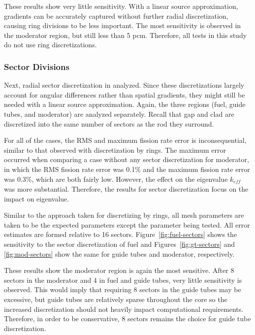 These results show very little sensitivity. With a linear source approximation, gradients can be accurately captured without further radial discretization, causing ring divisions to be less important. The most sensitivity is observed in the moderator region, but still less than 5 pcm. Therefore, all tests in this study do not use ring discretizations. 

\subsubsection{Sector Divisions}

Next, radial sector discretization in analyzed. Since these  discretizations largely account for angular differences rather than spatial gradients, they might still be needed with a linear source approximation. Again, the three regions (fuel, guide tubes, and moderator) are analyzed separately. Recall that gap and clad are discretized into the same number of sectors as the rod they surround.

For all of the cases, the \ac{RMS} and maximum fission rate error is inconsequential, similar to that observed with discretization by rings.  The maximum error occurred when comparing a case without any sector discretization for moderator, in which the \ac{RMS} fission rate error was 0.1\% and the maximum fission rate error was 0.3\%, which are both fairly low. However, the effect on the eigenvalue $k_{\textit{eff}}$ was more substantial. Therefore, the results for sector discretization focus on the impact on eigenvalue.

Similar to the approach taken for discretizing by rings, all mesh parameters are taken to be the expected parameters except the parameter being tested. All error estimates are formed relative to 16 sectors. Figure~\ref{fig:fuel-sectors} shows the sensitivity to the sector discretization of fuel and Figures~\ref{fig:gt-sectors} and \ref{fig:mod-sectors} show the same for guide tubes and moderator, respectively.

These results show the moderator region is again the most sensitive. After 8 sectors in the moderator and 4 in fuel and guide tubes, very little sensitivity is observed. This would imply that requiring 8 sectors in the guide tubes may be excessive, but guide tubes are relatively sparse throughout the core so the increased discretization should not heavily impact computational requirements. Therefore, in order to be conservative, 8 sectors remains the choice for guide tube discretization.
 
